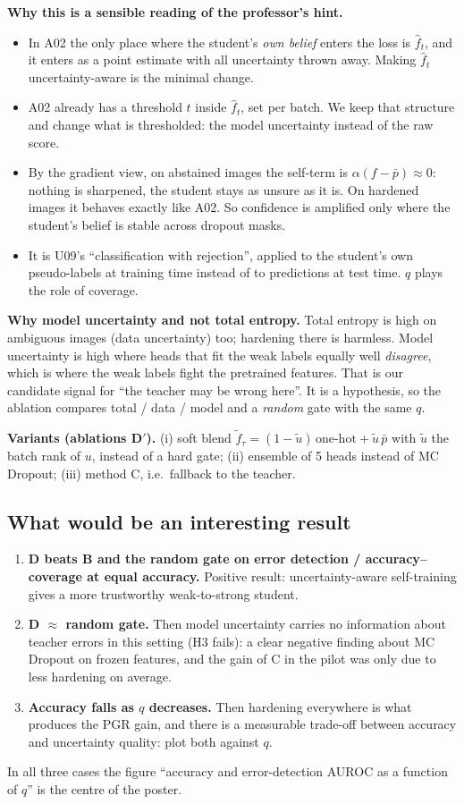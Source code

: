 \documentclass[10pt,a4paper]{article}
\newcommand{\fhat}{\hat f_t}
\newcommand{\ftil}{\tilde f_\tau}
\newcommand{\pbar}{\bar p}
\begin{document}
\textbf{Why this is a sensible reading of the professor's hint.}
\begin{itemize}
\item In A02 the only place where the student's \emph{own belief} enters the loss is $\fhat$, and it enters as
a point estimate with all uncertainty thrown away. Making $\fhat$ uncertainty-aware is the minimal change.
\item A02 already has a threshold $t$ inside $\fhat$, set per batch. We keep that structure and change what
is thresholded: the model uncertainty instead of the raw score.
\item By the gradient view, on abstained images the self-term is $\alpha(f-\pbar)\approx0$: nothing is
sharpened, the student stays as unsure as it is. On hardened images it behaves exactly like A02. So
confidence is amplified only where the student's belief is stable across dropout masks.
\item It is U09's ``classification with rejection'', applied to the student's own pseudo-labels at training
time instead of to predictions at test time. $q$ plays the role of coverage.
\end{itemize}

\textbf{Why model uncertainty and not total entropy.} Total entropy is high on ambiguous images (data
uncertainty) too; hardening there is harmless. Model uncertainty is high where heads that fit the weak
labels equally well \emph{disagree}, which is where the weak labels fight the pretrained features. That is
our candidate signal for ``the teacher may be wrong here''. It is a hypothesis, so the ablation compares
total / data / model and a \emph{random} gate with the same $q$.

\textbf{Variants (ablations D$'$).} (i) soft blend $\ftil=(1-\tilde u)\,\text{one-hot}+\tilde u\,\pbar$ with
$\tilde u$ the batch rank of $u$, instead of a hard gate; (ii) ensemble of 5 heads instead of MC Dropout;
(iii) method C, i.e.\ fallback to the teacher.

\subsection{What would be an interesting result}
\begin{enumerate}
\item \textbf{D beats B and the random gate on error detection / accuracy--coverage at equal accuracy.}
Positive result: uncertainty-aware self-training gives a more trustworthy weak-to-strong student.
\item \textbf{D $\approx$ random gate.} Then model uncertainty carries no information about teacher errors in this
setting (H3 fails): a clear negative finding about MC Dropout on frozen features, and the gain of C in the
pilot was only due to less hardening on average.
\item \textbf{Accuracy falls as $q$ decreases.} Then hardening everywhere is what produces the PGR gain, and there is
a measurable trade-off between accuracy and uncertainty quality: plot both against $q$.
\end{enumerate}
In all three cases the figure ``accuracy and error-detection AUROC as a function of $q$'' is the centre of the poster.
\end{document}
